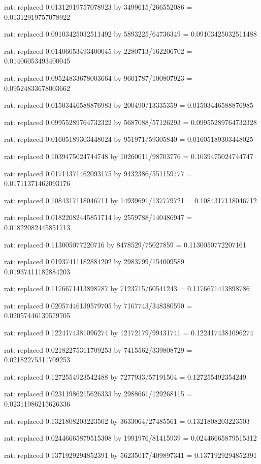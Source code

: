 \documentclass[a4paper,10pt]{article}
\begin{document}
\begin{eulernotebook}
\begin{eulercomment}
\begin{eulercomment}
\begin{eulercomment}
\begin{eulercomment}
\begin{eulercomment}
\begin{eulercomment}
\begin{eulercomment}
\begin{eulercomment}
\begin{eulercomment}
\begin{eulercomment}
\begin{eulercomment}
\begin{eulercomment}
\begin{eulercomment}
\begin{eulercomment}
\begin{eulercomment}
\begin{eulercomment}
\begin{euleroutput}
  rat: replaced 0.01312919757078923 by 3499615/266552086 = 0.01312919757078922
  
  rat: replaced 0.09103425032511492 by 5893225/64736349 = 0.09103425032511488
  
  rat: replaced 0.01406053493400045 by 2280713/162206702 = 0.01406053493400045
  
  rat: replaced 0.09524833678003664 by 9601787/100807923 = 0.09524833678003662
  
  rat: replaced 0.01503446588876983 by 200490/13335359 = 0.01503446588876985
  
  rat: replaced 0.09955289764732322 by 5687088/57126293 = 0.09955289764732328
  
  rat: replaced 0.01605189303448024 by 951971/59305840 = 0.01605189303448025
  
  rat: replaced 0.1039475024744748 by 10260011/98703776 = 0.1039475024744747
  
  rat: replaced 0.01711371462093175 by 9432386/551159477 = 0.01711371462093176
  
  rat: replaced 0.1084317118046711 by 14939691/137779721 = 0.1084317118046712
  
  rat: replaced 0.01822082445851714 by 2559788/140486947 = 0.01822082445851713
  
  rat: replaced 0.113005077220716 by 8478529/75027859 = 0.1130050772207161
  
  rat: replaced 0.01937411182884202 by 2983799/154009589 = 0.01937411182884203
  
  rat: replaced 0.1176671413898787 by 7123715/60541243 = 0.1176671413898786
  
  rat: replaced 0.02057446139579705 by 7167743/348380590 = 0.02057446139579705
  
  rat: replaced 0.1224174381096274 by 12172179/99431741 = 0.1224174381096274
  
  rat: replaced 0.02182275311709253 by 7415562/339808729 = 0.02182275311709253
  
  rat: replaced 0.1272554923542488 by 7277933/57191504 = 0.127255492354249
  
  rat: replaced 0.02311986215626333 by 2988661/129268115 = 0.02311986215626336
  
  rat: replaced 0.1321808203223502 by 3633064/27485561 = 0.1321808203223503
  
  rat: replaced 0.02446665879515308 by 1991976/81415939 = 0.02446665879515312
  
  rat: replaced 0.1371929294852391 by 56235017/409897341 = 0.1371929294852391
  

\end{euleroutput}
\end{eulercomment}
\end{eulercomment}
\end{eulercomment}
\end{eulercomment}
\end{eulercomment}
\end{eulercomment}
\end{eulercomment}
\end{eulercomment}
\end{eulercomment}
\end{eulercomment}
\end{eulercomment}
\end{eulercomment}
\end{eulercomment}
\end{eulercomment}
\end{eulercomment}
\end{eulercomment}
\end{eulernotebook}
\end{document}
